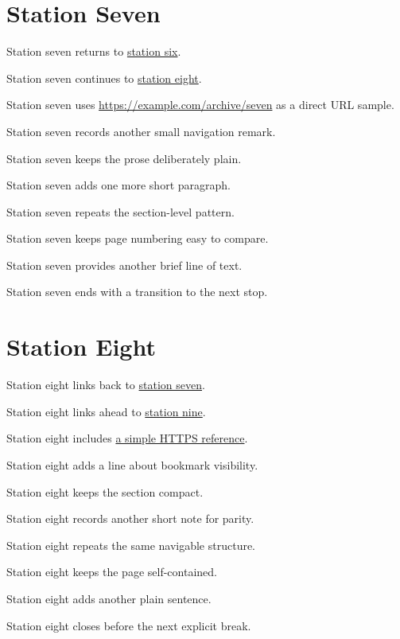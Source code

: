 \documentclass{article}
\begin{document}
\section{Station Seven}
\label{sec:station-seven}
Station seven returns to \hyperref[sec:station-six]{station six}.\par
Station seven continues to \hyperref[sec:station-eight]{station eight}.\par
Station seven uses \url{https://example.com/archive/seven} as a direct URL sample.\par
Station seven records another small navigation remark.\par
Station seven keeps the prose deliberately plain.\par
Station seven adds one more short paragraph.\par
Station seven repeats the section-level pattern.\par
Station seven keeps page numbering easy to compare.\par
Station seven provides another brief line of text.\par
Station seven ends with a transition to the next stop.\par
\newpage

\section{Station Eight}
\label{sec:station-eight}
Station eight links back to \hyperref[sec:station-seven]{station seven}.\par
Station eight links ahead to \hyperref[sec:station-nine]{station nine}.\par
Station eight includes \href{https://example.com/eight}{a simple HTTPS reference}.\par
Station eight adds a line about bookmark visibility.\par
Station eight keeps the section compact.\par
Station eight records another short note for parity.\par
Station eight repeats the same navigable structure.\par
Station eight keeps the page self-contained.\par
Station eight adds another plain sentence.\par
Station eight closes before the next explicit break.\par
\newpage
\end{document}
